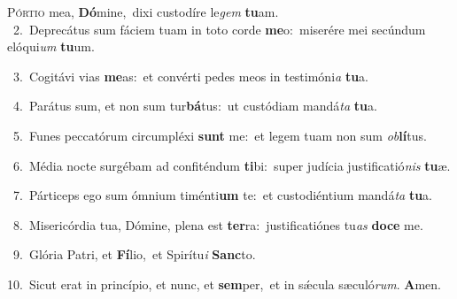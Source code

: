 \lettrine{\initial\textcolor{\initialcolor}{P}}{órtio} mea, \textbf{Dó}\-mine,~\star dixi custodíre le\textit{gem} \textbf{tu}\-am.\\
{\numbfont\textcolor{\numbcolor}{~2.}}~Deprecátus sum fáciem tuam in toto corde \textbf{me}\-o:~\star miserére mei secúndum elóqui\textit{um} \textbf{tu}\-um.\par
{\numbfont\textcolor{\numbcolor}{~3.}}~Cogitávi vias \textbf{me}\-as:~\star et convérti pedes meos in testimóni\textit{a} \textbf{tu}\-a.\par
{\numbfont\textcolor{\numbcolor}{~4.}}~Parátus sum, et non sum tur\-\textbf{bá}\-tus:~\star ut custódiam mandá\textit{ta} \textbf{tu}\-a.\par
{\numbfont\textcolor{\numbcolor}{~5.}}~Funes peccatórum circumpléxi \textbf{sunt} me:~\star et legem tuam non sum \textit{ob}\-\textbf{lí}tus.\par
{\numbfont\textcolor{\numbcolor}{~6.}}~Média nocte surgébam ad confiténdum \textbf{ti}\-bi:~\star super judícia justificatió\textit{nis} \textbf{tu}\-æ.\par
{\numbfont\textcolor{\numbcolor}{~7.}}~Párticeps ego sum ómnium timénti\textbf{um} te:~\star et custodiéntium mandá\textit{ta} \textbf{tu}\-a.\par
{\numbfont\textcolor{\numbcolor}{~8.}}~Misericórdia tua, Dómine, plena est \textbf{ter}\-ra:~\star justificatiónes tu\textit{as} \textbf{do}\-\textbf{ce} me.\par
{\numbfont\textcolor{\numbcolor}{~9.}}~Glória Patri, et \textbf{Fí}\-lio,~\star et Spirítu\textit{i} \textbf{Sanc}\-to.\par
{\numbfont\textcolor{\numbcolor}{10.}}~Sicut erat in princípio, et nunc, et \textbf{sem}\-per,~\star et in sǽcula sæculó\-\textit{rum}\-. \textbf{A}\-men.\par
